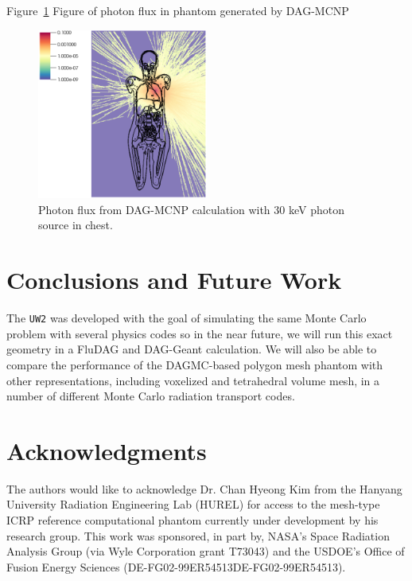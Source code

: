 \documentclass{anstrans}
\begin{document}
Figure~\ref{fig:mcnp} Figure of photon flux in phantom generated by DAG-MCNP
\begin{figure}[ht] %
  \centering
  \includegraphics[width=0.5\textwidth]{../figs/30KeV_Psource.png}
  \caption{Photon flux from DAG-MCNP calculation with 30 keV photon source in chest. }
  \label{fig:mcnp}
\end{figure}


\section{Conclusions and Future Work}

The \texttt{UW2} was developed with the goal of simulating the same Monte
Carlo problem with several physics codes so in the near future, we will run
this exact geometry in a FluDAG and DAG-Geant calculation. We will also be
able to compare the performance of the DAGMC-based polygon mesh phantom with
other representations, including voxelized and tetrahedral volume mesh, in a
number of different Monte Carlo radiation transport codes.

\section{Acknowledgments}

The authors would like to acknowledge Dr. Chan Hyeong Kim from the Hanyang University Radiation Engineering Lab (HUREL)
for access to the mesh-type ICRP reference computational phantom currently under development by his research group.
This work was sponsored, in part by, NASA's Space Radiation Analysis Group (via Wyle Corporation grant T73043)
and the USDOE's Office of Fusion Energy Sciences (DE-FG02-99ER54513DE-FG02-99ER54513).



\end{document}

